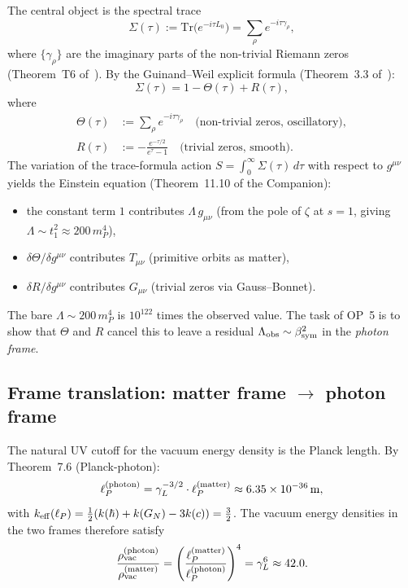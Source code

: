 The central object is the spectral trace
\[
  \Sigma(\tau) := \mathrm{Tr}\!\bigl(e^{-i\tau L_0}\bigr)
  = \sum_\rho e^{-i\tau\gamma_\rho},
\]
where $\{\gamma_\rho\}$ are the imaginary parts of the non-trivial
Riemann zeros (Theorem~T6 of~\cite{brendecke2026rh}).
By the Guinand--Weil explicit formula (Theorem~3.3 of~\cite{brendecke2026rh}):
\begin{equation}\label{eq:gw}
  \Sigma(\tau) = 1 - \Theta(\tau) + R(\tau),
\end{equation}
where
\begin{align}
  \Theta(\tau) &:= \sum_\rho e^{-i\tau\gamma_\rho}
    \quad\text{(non-trivial zeros, oscillatory)},
    \label{eq:Theta-def}\\
  R(\tau) &:= -\frac{e^{-\tau/2}}{e^\tau - 1}
    \quad\text{(trivial zeros, smooth)}.
    \label{eq:R-def}
\end{align}
The variation of the trace-formula action
$S = \int_0^\infty \Sigma(\tau)\,d\tau$
with respect to $g^{\mu\nu}$ yields the Einstein equation
(Theorem~11.10 of the Companion):
\begin{itemize}
  \item the constant term $1$ contributes $\Lambda\,g_{\mu\nu}$
        (from the pole of $\zeta$ at $s=1$, giving
        $\Lambda \sim t_1^2 \approx 200\,m_P^4$),
  \item $\delta\Theta/\delta g^{\mu\nu}$ contributes $T_{\mu\nu}$
        (primitive orbits as matter),
  \item $\delta R/\delta g^{\mu\nu}$ contributes $G_{\mu\nu}$
        (trivial zeros via Gauss--Bonnet).
\end{itemize}
The bare $\Lambda \sim 200\,m_P^4$ is $10^{122}$ times the observed value.
The task of OP~5 is to show that $\Theta$ and $R$ cancel this to leave
a residual $\Lambda_{\mathrm{obs}} \sim \beta_{\mathrm{sym}}^2$ in the \emph{photon frame}.

\subsection{Frame translation: matter frame $\to$ photon frame}

\begin{proposition}
\label{prop:uv-photon}
The natural UV cutoff for the vacuum energy density is the Planck
length. By Theorem~7.6 (Planck-photon):
\[
  \ell_P^{(\mathrm{photon})} = \gamma_L^{-3/2}\cdot\ell_P^{(\mathrm{matter})}
  \approx 6.35\times10^{-36}\,\mathrm{m},
\]
with $k_{\mathrm{eff}}(\ell_P) = \tfrac{1}{2}(k(\hbar)+k(G_N)-3k(c))
= \tfrac{3}{2}$.
The vacuum energy densities in the two frames therefore satisfy
\begin{equation}\label{eq:rho-ratio}
  \frac{\rho_{\mathrm{vac}}^{(\mathrm{photon})}}
       {\rho_{\mathrm{vac}}^{(\mathrm{matter})}}
  = \left(\frac{\ell_P^{(\mathrm{matter})}}{\ell_P^{(\mathrm{photon})}}\right)^4
  = \gamma_L^{6} \approx 42.0.
\end{equation}
\end{proposition}

